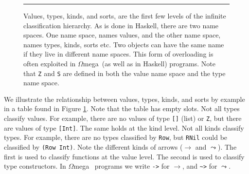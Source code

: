 \documentclass{sigplanconf}
\newcommand{\om}{$\Omega$mega}
\begin{document}
\begin{figure}[t]

\caption{Values, types, kinds, and sorts, are the first few levels of 
         the infinite classification hierarchy. As is done in Haskell, there are two name spaces. One name space, names values,
and the other name space, names types, kinds, sorts etc. Two objects can have
the same name if they live in different name spaces. This form of
overloading is often exploited in \om~(as well as in Haskell) programs.
Note that {\tt Z} and {\tt S} are defined in both the value name space and 
the type name space.}\label{table}
\hrule
\end{figure}

We illustrate the relationship between
values, types, kinds, and sorts by example in a table found in Figure
\ref{table}.
Note that the table has empty slots. Not all types classify values.
For example, there are no values of type \verb+[]+ (list) or \verb+Z+, but
there are values of type \verb+[Int]+. The same holds at the kind level.
Not all kinds classify types. For example, there are no types classified
by \verb+Row+, but {\tt RNil} could be classified by \verb+(Row Int)+. 
Note the different kinds of arrows ($\rightarrow$ and $\leadsto$). The first
is used to classify functions at the value level. The second is used to classify
type constructors. In \om~ programs we write \verb+->+ for $\rightarrow$, and
\verb+~>+ for $\leadsto$.
\end{document}
